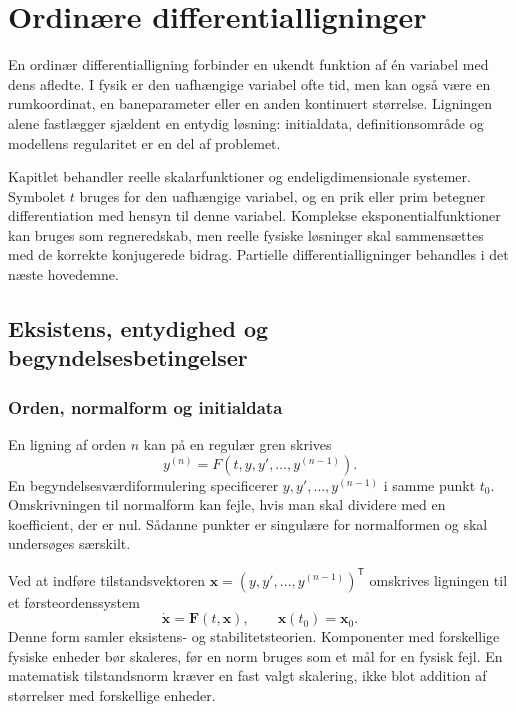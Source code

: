 \chapter{Ordinære differentialligninger}
\label{ch:ode}
En ordinær differentialligning forbinder en ukendt funktion af én variabel
med dens afledte. I fysik er den uafhængige variabel ofte tid, men kan
også være en rumkoordinat, en baneparameter eller en anden kontinuert
størrelse. Ligningen alene fastlægger sjældent en entydig løsning:
initialdata, definitionsområde og modellens regularitet er en del af
problemet.

Kapitlet behandler reelle skalarfunktioner og endeligdimensionale
systemer. Symbolet $t$ bruges for den uafhængige variabel, og en prik
eller prim betegner differentiation med hensyn til denne variabel.
Komplekse eksponentialfunktioner kan bruges som regneredskab, men reelle
fysiske løsninger skal sammensættes med de korrekte konjugerede bidrag.
Partielle differentialligninger behandles i det næste hovedemne.

\section{Eksistens, entydighed og begyndelsesbetingelser}
\label{sec:ode-eksistens}
\subsection{Orden, normalform og initialdata}
En ligning af orden $n$ kan på en regulær gren skrives
\[
 y^{(n)}=F(t,y,y',\ldots,y^{(n-1)}).
\]
En begyndelsesværdiformulering specificerer $y,y',\ldots,y^{(n-1)}$
i samme punkt $t_0$. Omskrivningen til normalform kan fejle, hvis man
skal dividere med en koefficient, der er nul. Sådanne punkter er
singulære for normalformen og skal undersøges særskilt.

Ved at indføre tilstandsvektoren
$\boldsymbol{x}=(y,y',\ldots,y^{(n-1)})^{\mathsf T}$ omskrives ligningen
til et førsteordenssystem
\begin{equation}
 \dot{\boldsymbol{x}}=\boldsymbol{F}(t,\boldsymbol{x}),\qquad
 \boldsymbol{x}(t_0)=\boldsymbol{x}_0.
 \label{eq:ode-ivp}
\end{equation}
Denne form samler eksistens- og stabilitetsteorien. Komponenter med
forskellige fysiske enheder bør skaleres, før en norm bruges som et mål
for en fysisk fejl. En matematisk tilstandsnorm kræver en fast valgt
skalering, ikke blot addition af størrelser med forskellige enheder.

